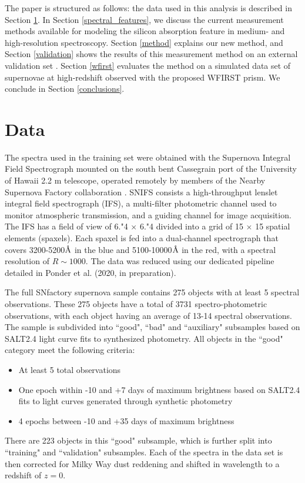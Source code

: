 The paper is structured as follows: the data used in this analysis is described in Section \ref{data}. In Section \ref{spectral_features}, we discuss the current measurement methods available for modeling the silicon absorption feature in medium- and high-resolution spectroscopy. Section \ref{method} explains our new method, and Section \ref{validation} shows the results of this measurement method on an external validation set \citep[BSNIP,][]{silverman_berkeley_2012}. Section \ref{wfirst} evaluates the method on a simulated data set of supernovae at high-redshift observed with the proposed WFIRST prism. We conclude in Section \ref{conclusions}.

\section{Data}
\label{data}
The spectra used in the training set were obtained with the Supernova Integral Field Spectrograph \citep[SNIFS,][]{lantz_snifs_2004} mounted on  the south bent Cassegrain port of the University of Hawaii 2.2 m telescope, operated remotely by members of the Nearby Supernova Factory collaboration \citep[SNfactory,][]{aldering_overview_2002}. SNIFS consists a high-throughput lenslet integral field spectrograph (IFS), a multi-filter photometric channel used to monitor atmospheric transmission, and a guiding channel for image acquisition. The IFS has a field of view of 6."4 $\times$ 6."4 divided into a grid of 15 $\times$ 15 spatial elements (spaxels). Each spaxel is fed into a dual-channel spectrograph that covers 3200-5200$\mbox{\normalfont\AA}$ in the blue and 5100-10000$\mbox{\normalfont\AA}$ in the red, with a spectral resolution of $R \sim 1000$. The data was reduced using our dedicated pipeline detailed in Ponder et al. (2020, in preparation).

The full SNfactory supernova sample contains 275 objects with at least 5 spectral observations. These 275 objects have a total of 3731 spectro-photometric observations, with each object having an average of 13-14 spectral observations. The sample is subdivided into ``good", ``bad" and ``auxiliary" subsamples based on SALT2.4 light curve fits to synthesized photometry. All objects in the ``good" category meet the following criteria:
\begin{itemize}
    \item At least 5 total observations
    \item One epoch within -10 and +7 days of maximum brightness based on SALT2.4 fits to light curves generated through synthetic photometry
    \item 4 epochs between -10 and +35 days of maximum brightness 
\end{itemize}
There are 223 objects in this ``good" subsample, which is further split into ``training" and ``validation" subsamples. Each of the spectra in the data set is then corrected for Milky Way dust reddening and shifted in wavelength to a redshift of $z=0$.

